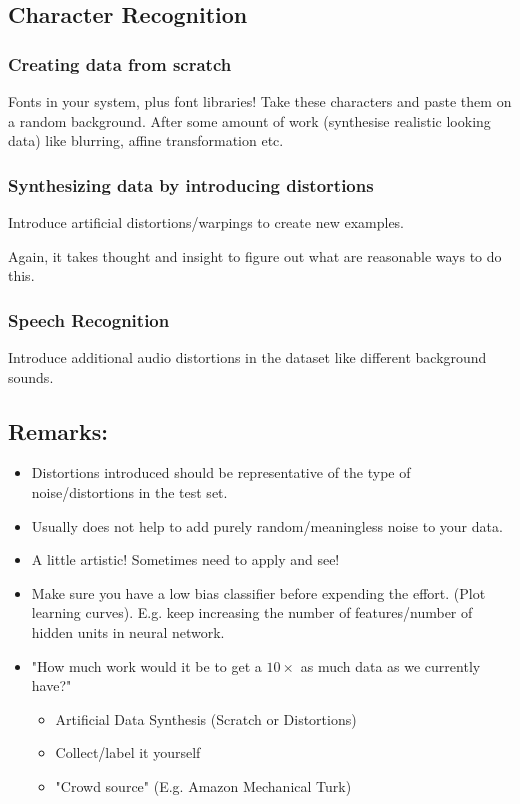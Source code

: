 \subsection{Character Recognition}
\subsubsection{Creating data from scratch}
Fonts in your system, plus font libraries! Take these characters and paste them
on a random background. After some amount of work (synthesise realistic looking
data) like blurring, affine transformation etc.
\subsubsection{Synthesizing data by introducing distortions}
Introduce artificial distortions/warpings to create new examples.

\begin{remark}
	Again, it takes thought and insight to figure out what are reasonable ways to do
	this.
\end{remark}

\subsubsection{Speech Recognition}
Introduce additional audio distortions in the dataset like different background sounds.

\subsection{Remarks:}
\begin{itemize}
	\item Distortions introduced should be representative of the type of
	      noise/distortions in the test set.
	\item Usually does not help to add purely random/meaningless noise to
	      your data.
	\item A little artistic! Sometimes need to apply and see!
	\item Make sure you have a low bias classifier before expending the
	      effort. (Plot learning curves). E.g. keep increasing the number
	      of features/number of hidden units in neural network.
	\item "How much work would it be to get a $10\times$ as much data as
	      we currently have?" \begin{itemize}
		      \item Artificial Data Synthesis (Scratch or Distortions)
		      \item Collect/label it yourself
		      \item "Crowd source" (E.g. Amazon Mechanical Turk)
	      \end{itemize}
\end{itemize}

